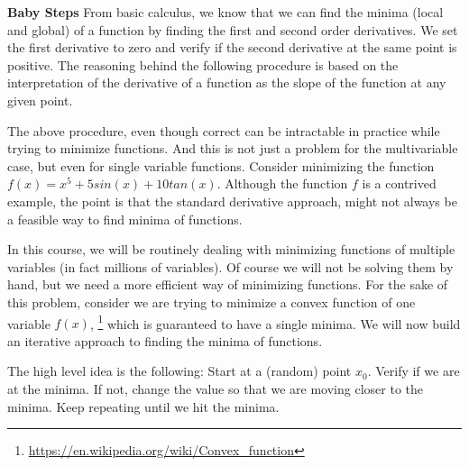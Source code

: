 \documentclass[solution,addpoints,12pt]{exam}
\begin{document}
\begin{questions}
\question \textbf{Baby Steps}
          \newline
          From basic calculus, we know that we can find the minima (local and global) of a function
          by finding the first and second order derivatives. We set the first derivative to zero
          and verify if the second derivative at the same point is positive. The reasoning behind
          the following procedure is based on the interpretation of the derivative of a function
          as the slope of the function at any given point.

          The above procedure, even though correct can be intractable in practice while trying
          to minimize functions. And this is not just a problem for the multivariable case, but
          even for single variable functions. Consider minimizing the function $f(x) = x^5 + 5sin(x) + 10tan(x)$.
          Although the function $f$ is a contrived example, the point is that the standard derivative approach, might
          not always be a feasible way to find minima of functions.

          In this course, we will be routinely dealing with minimizing functions of multiple variables (in fact millions of
          variables). Of course we will not be solving them by hand, but we need a more efficient way of minimizing
          functions. For the sake of this problem, consider we are trying to minimize a convex function of one variable $f(x)$, \footnote{\url{https://en.wikipedia.org/wiki/Convex_function}} which is guaranteed to have a single minima. We will now build an iterative approach to finding the minima of functions.

          The high level idea is the following:
          \newline
          Start at a (random) point $x_0$. Verify if we are at the minima. If not, change the
          value so that we are moving closer to the minima. Keep repeating until we hit the minima.

\end{questions}
\end{document}
